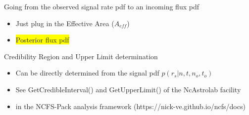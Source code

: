 \Tr
\begin{center}
{\red Going from the observed signal rate pdf to an incoming flux pdf}
\end{center}
%
\begin{itemize}
\item Just plug in the {\blue Effective Area} ($A_{eff}$)
\item[] \begin{center}
        \colorbox{yellow}{Posterior flux pdf}\\[1mm]
        {\blue {}}
        \end{center}
\end{itemize}
%
\begin{center}
{\red Credibility Region and Upper Limit determination}
\end{center}
%
\begin{itemize}
\item Can be directly determined from the signal pdf $p(r_{s}|n,t,n_{o},t_{o})$
\item {\blue See GetCredibleInterval() and GetUpperLimit() of the NcAstrolab facility}
\item[] {\blue in the NCFS-Pack analysis framework (https://nick-ve.github.io/ncfs/docs)}
\end{itemize}
